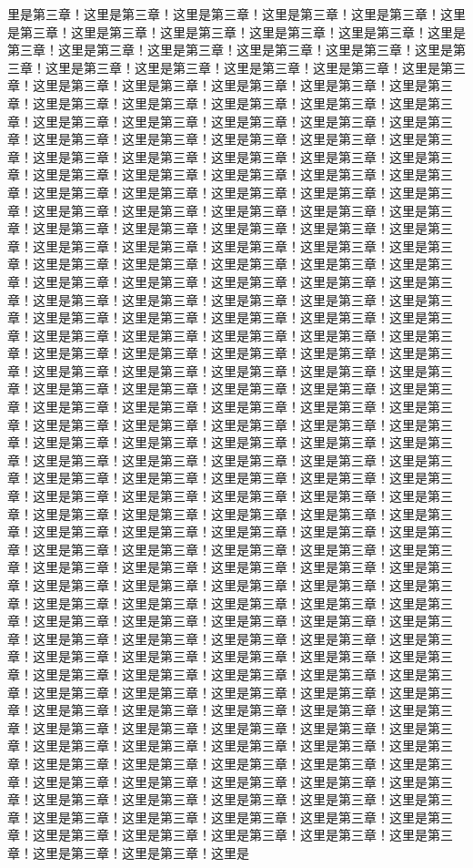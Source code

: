 里是第三章！这里是第三章！这里是第三章！这里是第三章！这里是第三章！这里是第三章！这里是第三章！这里是第三章！这里是第三章！这里是第三章！这里是第三章！这里是第三章！这里是第三章！这里是第三章！这里是第三章！这里是第三章！这里是第三章！这里是第三章！这里是第三章！这里是第三章！这里是第三章！这里是第三章！这里是第三章！这里是第三章！这里是第三章！这里是第三章！这里是第三章！这里是第三章！这里是第三章！这里是第三章！这里是第三章！这里是第三章！这里是第三章！这里是第三章！这里是第三章！这里是第三章！这里是第三章！这里是第三章！这里是第三章！这里是第三章！这里是第三章！这里是第三章！这里是第三章！这里是第三章！这里是第三章！这里是第三章！这里是第三章！这里是第三章！这里是第三章！这里是第三章！这里是第三章！这里是第三章！这里是第三章！这里是第三章！这里是第三章！这里是第三章！这里是第三章！这里是第三章！这里是第三章！这里是第三章！这里是第三章！这里是第三章！这里是第三章！这里是第三章！这里是第三章！这里是第三章！这里是第三章！这里是第三章！这里是第三章！这里是第三章！这里是第三章！这里是第三章！这里是第三章！这里是第三章！这里是第三章！这里是第三章！这里是第三章！这里是第三章！这里是第三章！这里是第三章！这里是第三章！这里是第三章！这里是第三章！这里是第三章！这里是第三章！这里是第三章！这里是第三章！这里是第三章！这里是第三章！这里是第三章！这里是第三章！这里是第三章！这里是第三章！这里是第三章！这里是第三章！这里是第三章！这里是第三章！这里是第三章！这里是第三章！这里是第三章！这里是第三章！这里是第三章！这里是第三章！这里是第三章！这里是第三章！这里是第三章！这里是第三章！这里是第三章！这里是第三章！这里是第三章！这里是第三章！这里是第三章！这里是第三章！这里是第三章！这里是第三章！这里是第三章！这里是第三章！这里是第三章！这里是第三章！这里是第三章！这里是第三章！这里是第三章！这里是第三章！这里是第三章！这里是第三章！这里是第三章！这里是第三章！这里是第三章！这里是第三章！这里是第三章！这里是第三章！这里是第三章！这里是第三章！这里是第三章！这里是第三章！这里是第三章！这里是第三章！这里是第三章！这里是第三章！这里是第三章！这里是第三章！这里是第三章！这里是第三章！这里是第三章！这里是第三章！这里是第三章！这里是第三章！这里是第三章！这里是第三章！这里是第三章！这里是第三章！这里是第三章！这里是第三章！这里是第三章！这里是第三章！这里是第三章！这里是第三章！这里是第三章！这里是第三章！这里是第三章！这里是第三章！这里是第三章！这里是第三章！这里是第三章！这里是第三章！这里是第三章！这里是第三章！这里是第三章！这里是第三章！这里是第三章！这里是第三章！这里是第三章！这里是第三章！这里是第三章！这里是第三章！这里是第三章！这里是第三章！这里是第三章！这里是第三章！这里是第三章！这里是第三章！这里是第三章！这里是第三章！这里是第三章！这里是第三章！这里是第三章！这里是第三章！这里是第三章！这里是第三章！这里是第三章！这里是第三章！这里是第三章！这里是第三章！这里是第三章！这里是第三章！这里是第三章！这里是第三章！这里是第三章！这里是第三章！这里是第三章！这里是第三章！这里是第三章！这里是第三章！这里是第三章！这里是第三章！这里是第三章！这里是第三章！这里是第三章！这里是第三章！这里是第三章！这里是第三章！这里是第三章！这里是第三章！这里是第三章！这里是第三章！这里是第三章！这里是第三章！这里是第三章！这里是第三章！这里是第三章！这里是第三章！这里是第三章！这里是第三章！这里是第三章！这里是第三章！这里是第三章！这里是第三章！这里是第三章！这里是第三章！这里是第三章！这里是第三章！这里是第三章！这里是第三章！这里是第三章！这里是第三章！这里是第三章！这里是第三章！这里是第三章！这里是